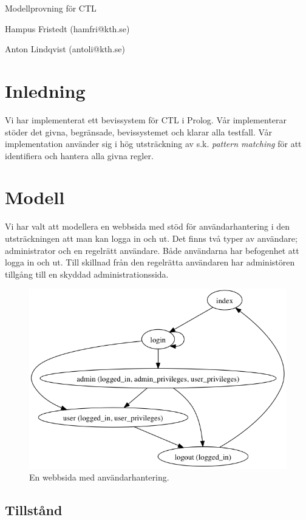\documentclass{article}
\begin{document}
  \centerline{\sc \large Modellprovning för CTL}
  \vspace{.5pc}
  \centerline{Hampus Fristedt (hamfri@kth.se)}
  \centerline{Anton Lindqvist (antoli@kth.se)}
  \vspace{2pc}

  \section{Inledning}
  Vi har implementerat ett bevissystem för CTL i Prolog. Vår implementerar
  stöder det givna, begränsade, bevissystemet och klarar alla testfall. Vår
  implementation använder sig i hög utsträckning av s.k. \emph{pattern matching}
  för att identifiera och hantera alla givna regler.

  \section{Modell}
  Vi har valt att modellera en webbsida med stöd för användarhantering i den
  utsträckningen att man kan logga in och ut. Det finns två typer av användare;
  administrator och en regelrätt användare. Både användarna har befogenhet att
  logga in och ut. Till skillnad från den regelrätta användaren har administören
  tillgång till en skyddad administrationssida.
  \begin{figure}[h!]
    \centering
    \includegraphics[scale=0.4]{model.png}
    \caption{En webbsida med användarhantering.}
  \end{figure}

  \subsection{Tillstånd}
\end{document}
